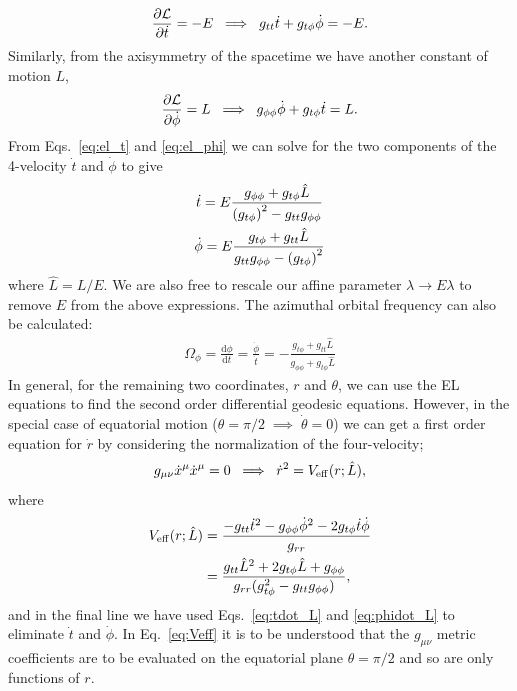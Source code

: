 \begin{equation}\label{eq:el_t} 
	\pdv{\mathcal{L}}{\dot{t}} = -E \;\implies\; g_{tt}\dot{t} + g_{t\phi}\dot{\phi} = -E.
\end{equation}
Similarly, from the axisymmetry of the spacetime we have another constant of motion $L$,
\begin{equation}\label{eq:el_phi}
	\pdv{\mathcal{L}}{\dot{\phi}} =L \;\implies\; g_{\phi \phi}\dot{\phi} + g_{t\phi}\dot{t} = L.
\end{equation}
From Eqs.~\ref{eq:el_t} and \ref{eq:el_phi} we can solve for the two components of the 4-velocity $\dot{t}$ and $\dot{\phi}$ to give
\begin{gather} \label{eq:tdot_L}
	\dot{t} = E \frac{g_{\phi \phi} + g_{t \phi}\hat{L}}{\qty(g_{t \phi})^2 - g_{t t}g_{\phi \phi}} \\
	\label{eq:phidot_L}
	\dot{\phi} = E \frac{g_{t \phi} + g_{t t}\hat{L}}{g_{t t}g_{\phi \phi} - \qty(g_{t \phi})^2}
\end{gather}
where $\hat{L} = L/E$.
We are also free to rescale our affine parameter $\lambda\rightarrow E\lambda$ to remove $E$ from the above expressions.
The azimuthal orbital frequency can also be calculated:
\begin{gather}
	\Omega_\phi = \frac{\mathrm{d}\phi}{\mathrm{d}t} =  \frac{\dot{\phi}}{\dot{t}} = -\frac{g_{t\phi}+g_{tt}\hat{L}}{g_{\phi\phi}+g_{t\phi}\hat{L}}
\end{gather}
In general, for the remaining two coordinates, $r$ and $\theta$, we can use the EL equations to find the second order differential geodesic equations.
However, in the special case of equatorial motion ($\theta=\pi/2\;\implies\;\dot{\theta}=0$) we can get a first order equation for $\dot{r}$ by considering the normalization of the four-velocity;
\begin{equation} \label{eq:rdot}
	g_{\mu\nu}\dot{x}^\mu\dot{x}^\mu = 0 \;\implies\; \dot{r}^2 = V_{\rm eff}(r;\hat{L}),
\end{equation}
where
\begin{align}\label{eq:Veff}
	V_{\rm eff}(r;\hat{L}) &= \frac{-g_{tt}\dot{t}^2 -g_{\phi\phi}\dot{\phi}^2-2g_{t\phi}\dot{t}\dot{\phi} }{g_{rr}} \nonumber \\
	&= \frac{g_{tt} \hat{L}^2+2 g_{t\phi } \hat{L}+g_{\phi\phi}}{g_{rr}(g_{t\phi}^2-g_{tt} g_{\phi \phi})},
\end{align}
and in the final line we have used Eqs.~\ref{eq:tdot_L} and \ref{eq:phidot_L} to eliminate $\dot{t}$ and $\dot{\phi}$.
In Eq.~\ref{eq:Veff} it is to be understood that the $g_{\mu\nu}$ metric coefficients are to be evaluated on the equatorial plane $\theta=\pi/2$ and so are only functions of $r$.

